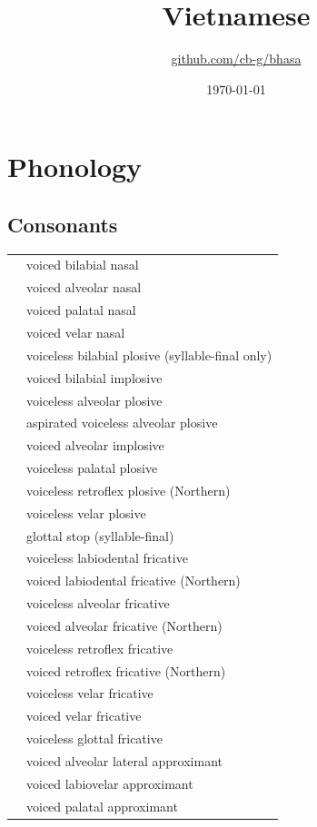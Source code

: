 \documentclass{article}
\title{Vietnamese\\\ipa{[ti@N vi@\super{P}t]}}
\author{\href{https://github.com/cb-g/bhasa}{github.com/cb-g/bhasa}}
\date{\today}
\begin{document}
\pagecolor{custom_bg}\color{custom_fg}
\maketitle\thispagestyle{empty}

\newpage\setcounter{page}{1}\section{Phonology}

\subsection{Consonants}

\begin{xltabular}{\textwidth}{lL}
   & voiced bilabial nasal \\
   & voiced alveolar nasal \\
  \ipa{\textltailn} & voiced palatal nasal \\
   & voiced velar nasal \\
   & voiceless bilabial plosive (syllable-final only) \\
   & voiced bilabial implosive \\
   & voiceless alveolar plosive \\
   & aspirated voiceless alveolar plosive \\
   & voiced alveolar implosive \\
   & voiceless palatal plosive \\
   & voiceless retroflex plosive (Northern) \\
   & voiceless velar plosive \\
   & glottal stop (syllable-final) \\
   & voiceless labiodental fricative \\
   & voiced labiodental fricative (Northern) \\
   & voiceless alveolar fricative \\
   & voiced alveolar fricative (Northern) \\
   & voiceless retroflex fricative \\
   & voiced retroflex fricative (Northern) \\
   & voiceless velar fricative \\
   & voiced velar fricative \\
   & voiceless glottal fricative \\
   & voiced alveolar lateral approximant \\
   & voiced labiovelar approximant \\
   & voiced palatal approximant \\
\end{xltabular}
\end{document}
